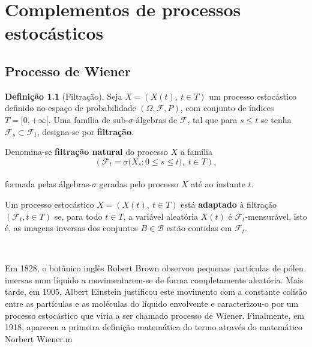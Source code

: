 \documentclass[
  11pt,
  a4paper,
]{book}
\theoremstyle{definition}
\newtheorem{definition}{Definição}[chapter]
\theoremstyle{definition}
\theoremstyle{definition}
\theoremstyle{definition}
\theoremstyle{remark}
\begin{document}
\chapter{Complementos de processos estocásticos}\label{complementos-de-processos-estocasticos}

\section{Processo de Wiener}\label{processo-de-wiener}

\begin{definition}[Filtração]
Seja \(X = (X(t), ~ t \in T)\) um processo estocástico definido no espaço de probabilidade \((\Omega, \mathcal{F}, P)\), com conjunto de índices \(T = [0, +\infty[\). Uma família de sub-\(\sigma\)-álgebras de \(\mathcal{F}\), tal que para \(s \leq t\) se tenha \(\mathcal{F}_s \subset \mathcal{F}_t\), designa-se por \textbf{filtração}.

Denomina-se \textbf{filtração natural} do processo \(X\) a família\\
\[
\left(\mathcal{F}_t = \sigma\big(X_s : 0 \leq s \leq t\big), \; t \in T\right),
\]\\
formada pelas álgebras-\(\sigma\) geradas pelo processo \(X\) até ao instante \(t\).

Um processo estocástico \(X = (X(t), ~ t \in T)\) está \textbf{adaptado} à filtração \((\mathcal{F}_t, t \in T)\) se, para todo \(t \in T\), a variável aleatória \(X(t)\) é \(\mathcal{F}_t\)-mensurável, isto é, as imagens inversas dos conjuntos \(B \in \mathcal{B}\) estão contidas em \(\mathcal{F}_t\).
\end{definition}

\(\,\)

Em 1828, o botânico inglês Robert Brown observou pequenas partículas de pólen imersas num líquido a movimentarem-se de forma completamente aleatória. Mais tarde, em 1905, Albert Einstein justificou este movimento com a constante colisão entre as partículas e as moléculas do líquido envolvente e caracterizou-o por um processo estocástico que viria a ser chamado processo de Wiener. Finalmente, em 1918, apareceu a primeira definição matemática do termo através do matemático Norbert Wiener.m

\(\,\)
\end{document}
